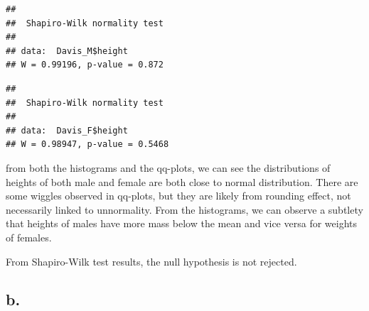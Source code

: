 \documentclass[
]{article}
\newenvironment{Shaded}{\begin{snugshade}}{\end{snugshade}}
\newcommand{\CommentTok}[1]{\textcolor[rgb]{0.56,0.35,0.01}{\textit{#1}}}
\newcommand{\FunctionTok}[1]{\textcolor[rgb]{0.13,0.29,0.53}{\textbf{#1}}}
\newcommand{\NormalTok}[1]{#1}
\newcommand{\SpecialCharTok}[1]{\textcolor[rgb]{0.81,0.36,0.00}{\textbf{#1}}}
\begin{document}
\begin{Shaded}
\end{Shaded}

\begin{verbatim}
## 
##  Shapiro-Wilk normality test
## 
## data:  Davis_M$height
## W = 0.99196, p-value = 0.872
\end{verbatim}

\begin{Shaded}
\end{Shaded}

\begin{verbatim}
## 
##  Shapiro-Wilk normality test
## 
## data:  Davis_F$height
## W = 0.98947, p-value = 0.5468
\end{verbatim}

from both the histograms and the qq-plots, we can see the distributions
of heights of both male and female are both close to normal
distribution. There are some wiggles observed in qq-plots, but they are
likely from rounding effect, not necessarily linked to unnormality. From
the histograms, we can observe a subtlety that heights of males have
more mass below the mean and vice versa for weights of females.

From Shapiro-Wilk test results, the null hypothesis is not rejected.

\subsection{b.}\label{b.}
\end{document}

